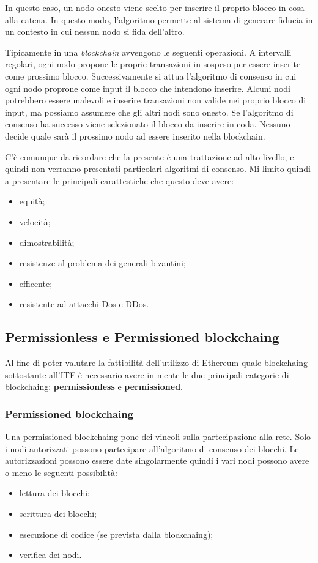 In questo caso, un nodo onesto viene scelto per inserire il proprio blocco in cosa alla catena. In questo modo, l'algoritmo permette al sistema di generare fiducia in un contesto in cui nessun nodo si fida dell'altro.

Tipicamente in una \emph{blockchain} avvengono le seguenti operazioni. A intervalli regolari, ogni nodo propone le proprie transazioni in sospeso per essere inserite come prossimo blocco. Successivamente si attua l'algoritmo di consenso in cui ogni nodo proprone come input il blocco che intendono inserire. Alcuni nodi potrebbero essere malevoli e inserire transazioni non valide nei proprio blocco di input, ma possiamo assumere che gli altri nodi sono onesto. Se l'algoritmo di consenso ha successo viene selezionato il blocco da inserire in coda. Nessuno decide quale sarà il prossimo nodo ad essere inserito nella blockchain.

C'è comunque da ricordare che la presente è una trattazione ad alto livello, e quindi non verranno presentati particolari algoritmi di consenso. Mi limito quindi a presentare le principali carattestiche che questo deve avere:
\begin{itemize}
    \item equità;
    \item velocità;
    \item dimostrabilità;
    \item resistenze al problema dei generali bizantini;
    \item efficente;
    \item resistente ad attacchi Dos e DDos.
\end{itemize}

\subsection{Permissionless e Permissioned \gls{blockchaing}}
Al fine di poter valutare la fattibilità dell’utilizzo di Ethereum quale \gls{blockchaing} sottostante all’ITF è necessario avere in mente le due principali categorie di \gls{blockchaing}: \textbf{permissionless} e \textbf{permissioned}.

\subsubsection{Permissioned \gls{blockchaing}}
Una permissioned \gls{blockchaing} pone dei vincoli sulla partecipazione alla rete. Solo i nodi autorizzati possono partecipare all’algoritmo di consenso dei blocchi. Le autorizzazioni possono essere date singolarmente quindi i vari nodi possono avere o meno le seguenti possibilità:
\begin{itemize}
    \item lettura dei blocchi;
    \item scrittura dei blocchi;
    \item esecuzione di codice (se prevista dalla \gls{blockchaing});
    \item verifica dei nodi.
\end{itemize}

